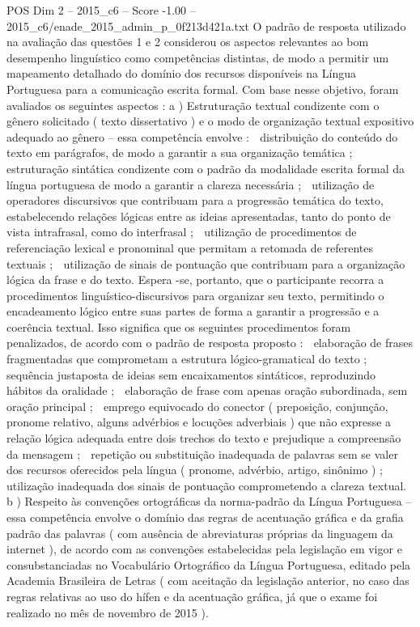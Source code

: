 \begin{textsample}{POS Dim 2 – 2015\_c6 – Score -1.00 – 2015\_c6/enade\_2015\_admin\_p\_0f213d421a.txt}
O padrão de resposta utilizado na avaliação das questões 1 e 2 considerou os aspectos relevantes ao bom desempenho linguístico como competências distintas, de modo a permitir um mapeamento detalhado do domínio dos recursos disponíveis na Língua Portuguesa para a comunicação escrita formal.
Com base nesse objetivo, foram avaliados os seguintes aspectos : a ) Estruturação textual condizente com o gênero solicitado ( texto dissertativo ) e o modo de organização textual expositivo adequado ao gênero – essa competência envolve :  distribuição do conteúdo do texto em parágrafos, de modo a garantir a sua organização temática ;  estruturação sintática condizente com o padrão da modalidade escrita formal da língua portuguesa de modo a garantir a clareza necessária ;  utilização de operadores discursivos que contribuam para a progressão temática do texto, estabelecendo relações lógicas entre as ideias apresentadas, tanto do ponto de vista intrafrasal, como do interfrasal ;  utilização de procedimentos de referenciação lexical e pronominal que permitam a retomada de referentes textuais ;  utilização de sinais de pontuação que contribuam para a organização lógica da frase e do texto.
Espera -se, portanto, que o participante recorra a procedimentos linguístico-discursivos para organizar seu texto, permitindo o encadeamento lógico entre suas partes de forma a garantir a progressão e a coerência textual.
Isso significa que os seguintes procedimentos foram penalizados, de acordo com o padrão de resposta proposto :  elaboração de frases fragmentadas que comprometam a estrutura lógico-gramatical do texto ;  sequência justaposta de ideias sem encaixamentos sintáticos, reproduzindo hábitos da oralidade ;  elaboração de frase com apenas oração subordinada, sem oração principal ;  emprego equivocado do conector ( preposição, conjunção, pronome relativo, alguns advérbios e locuções adverbiais ) que não expresse a relação lógica adequada entre dois trechos do texto e prejudique a compreensão da mensagem ;  repetição ou substituição inadequada de palavras sem se valer dos recursos oferecidos pela língua ( pronome, advérbio, artigo, sinônimo ) ;  utilização inadequada dos sinais de pontuação comprometendo a clareza textual. b ) Respeito às convenções ortográficas da norma-padrão da Língua Portuguesa – essa competência envolve o domínio das regras de acentuação gráfica e da grafia padrão das palavras ( com ausência de abreviaturas próprias da linguagem da internet ), de acordo com as convenções estabelecidas pela legislação em vigor e consubstanciadas no Vocabulário Ortográfico da Língua Portuguesa, editado pela Academia Brasileira de Letras ( com aceitação da legislação anterior, no caso das regras relativas ao uso do hífen e da acentuação gráfica, já que o exame foi realizado no mês de novembro de 2015 ).

\end{textsample}

